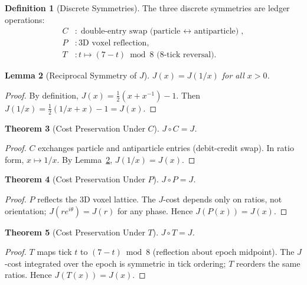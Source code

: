 \documentclass[12pt,a4paper]{article}
\newtheorem{theorem}{Theorem}[section]
\newtheorem{lemma}[theorem]{Lemma}
\theoremstyle{definition}
\newtheorem{definition}[theorem]{Definition}
\theoremstyle{remark}
\begin{document}
\begin{definition}[Discrete Symmetries]
\label{def:discrete}
The three discrete symmetries are ledger operations:
\begin{align}
  C &: \text{double-entry swap (particle $\leftrightarrow$ antiparticle)}, \\
  P &: \text{3D voxel reflection}, \\
  T &: t \mapsto (7 - t) \bmod 8 \text{ (8-tick reversal)}.
\end{align}
\end{definition}

\begin{lemma}[Reciprocal Symmetry of $J$]
\label{lem:reciprocal}
$J(x) = J(1/x)$ for all $x > 0$.
\end{lemma}

\begin{proof}
By definition, $J(x) = \frac{1}{2}(x + x^{-1}) - 1$.  Then
$J(1/x) = \frac{1}{2}(1/x + x) - 1 = J(x)$.
\end{proof}

\begin{theorem}[Cost Preservation Under $C$]
\label{thm:c-preserves}
$J \circ C = J$.
\end{theorem}

\begin{proof}
$C$ exchanges particle and antiparticle entries (debit-credit swap).  In
ratio form, $x \mapsto 1/x$.  By Lemma~\ref{lem:reciprocal}, $J(1/x) = J(x)$.
\end{proof}

\begin{theorem}[Cost Preservation Under $P$]
\label{thm:p-preserves}
$J \circ P = J$.
\end{theorem}

\begin{proof}
$P$ reflects the 3D voxel lattice.  The $J$-cost depends only on ratios, not
orientation; $J(re^{i\theta}) = J(r)$ for any phase.  Hence $J(P(x)) = J(x)$.
\end{proof}

\begin{theorem}[Cost Preservation Under $T$]
\label{thm:t-preserves}
$J \circ T = J$.
\end{theorem}

\begin{proof}
$T$ maps tick $t$ to $(7-t) \bmod 8$ (reflection about epoch midpoint).  The
$J$-cost integrated over the epoch is symmetric in tick ordering; $T$
reorders the same ratios.  Hence $J(T(x)) = J(x)$.
\end{proof}
\end{document}

